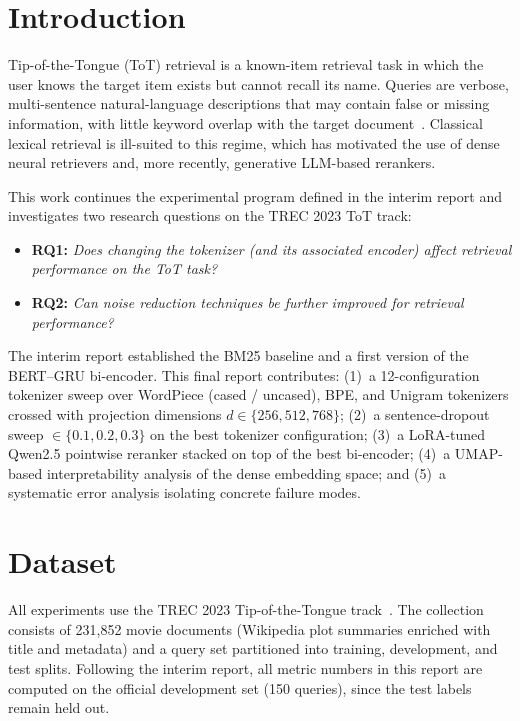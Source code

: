 \documentclass[conference]{IEEEtran}
\begin{document}
\section{Introduction}
Tip-of-the-Tongue (ToT) retrieval is a known-item retrieval task in which
the user knows the target item exists but cannot recall its name. Queries
are verbose, multi-sentence natural-language descriptions that may contain
false or missing information, with little keyword overlap with the target
document~\cite{soboroff2023totoverview}. Classical lexical retrieval is
ill-suited to this regime, which has motivated the use of dense neural
retrievers and, more recently, generative LLM-based rerankers.

This work continues the experimental program defined in the interim
report and investigates two research questions on the TREC 2023 ToT track:
\begin{itemize}
    \item \textbf{RQ1:} \emph{Does changing the tokenizer (and its associated
          encoder) affect retrieval performance on the ToT task?}
    \item \textbf{RQ2:} \emph{Can noise reduction techniques be further
          improved for retrieval performance?}
\end{itemize}
The interim report established the BM25 baseline and a first version of the
BERT--GRU bi-encoder. This final report contributes:
(1)~a 12-configuration tokenizer sweep over WordPiece (cased / uncased),
BPE, and Unigram tokenizers crossed with projection dimensions
$d \in \{256, 512, 768\}$;
(2)~a sentence-dropout sweep $\in \{0.1, 0.2, 0.3\}$ on the best
tokenizer configuration;
(3)~a LoRA-tuned Qwen2.5 pointwise reranker stacked on top of the best
bi-encoder; (4)~a UMAP-based interpretability analysis of the dense
embedding space; and (5)~a systematic error analysis isolating concrete
failure modes.

\section{Dataset}
All experiments use the TREC 2023 Tip-of-the-Tongue track~\cite{soboroff2023totoverview}.
The collection consists of 231{,}852 movie documents (Wikipedia plot
summaries enriched with title and metadata) and a query set partitioned into
training, development, and test splits. Following the interim report, all
metric numbers in this report are computed on the official development set
(150 queries), since the test labels remain held out.
\end{document}
